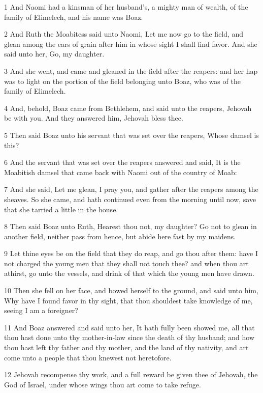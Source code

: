 \par 1 And Naomi had a kinsman of her husband's, a mighty man of wealth, of the family of Elimelech, and his name was Boaz.
\par 2 And Ruth the Moabitess said unto Naomi, Let me now go to the field, and glean among the ears of grain after him in whose sight I shall find favor. And she said unto her, Go, my daughter.
\par 3 And she went, and came and gleaned in the field after the reapers: and her hap was to light on the portion of the field belonging unto Boaz, who was of the family of Elimelech.
\par 4 And, behold, Boaz came from Bethlehem, and said unto the reapers, Jehovah be with you. And they answered him, Jehovah bless thee.
\par 5 Then said Boaz unto his servant that was set over the reapers, Whose damsel is this?
\par 6 And the servant that was set over the reapers answered and said, It is the Moabitish damsel that came back with Naomi out of the country of Moab:
\par 7 And she said, Let me glean, I pray you, and gather after the reapers among the sheaves. So she came, and hath continued even from the morning until now, save that she tarried a little in the house.
\par 8 Then said Boaz unto Ruth, Hearest thou not, my daughter? Go not to glean in another field, neither pass from hence, but abide here fast by my maidens.
\par 9 Let thine eyes be on the field that they do reap, and go thou after them: have I not charged the young men that they shall not touch thee? and when thou art athirst, go unto the vessels, and drink of that which the young men have drawn.
\par 10 Then she fell on her face, and bowed herself to the ground, and said unto him, Why have I found favor in thy sight, that thou shouldest take knowledge of me, seeing I am a foreigner?
\par 11 And Boaz answered and said unto her, It hath fully been showed me, all that thou hast done unto thy mother-in-law since the death of thy husband; and how thou hast left thy father and thy mother, and the land of thy nativity, and art come unto a people that thou knewest not heretofore.
\par 12 Jehovah recompense thy work, and a full reward be given thee of Jehovah, the God of Israel, under whose wings thou art come to take refuge.
